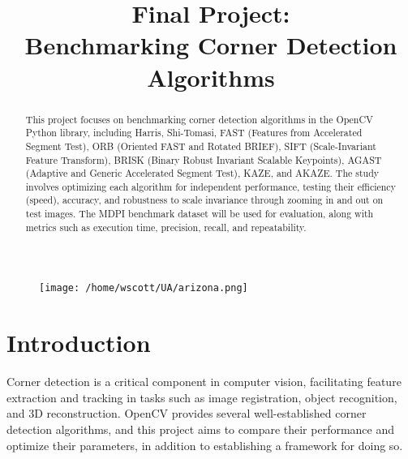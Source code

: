 \documentclass[journal]{IEEEtran}
\begin{document}
\title{Final Project:\\Benchmarking Corner Detection Algorithms}

\author{
}

\maketitle

\thispagestyle{plain}  %
\pagestyle{plain} 

\begin{figure}[H]
    \centering
    \begin{minipage}{\textwidth}
        \centering
    \texttt{[image: /home/wscott/UA/arizona.png]}
    \end{minipage}
\end{figure}

\onecolumn
\twocolumn
\pagebreak

\begin{abstract}
This project focuses on benchmarking corner detection algorithms in the OpenCV Python library, including Harris, Shi-Tomasi, FAST (Features from Accelerated Segment Test), ORB (Oriented FAST and Rotated BRIEF), SIFT (Scale-Invariant Feature Transform), BRISK (Binary Robust Invariant Scalable Keypoints), AGAST (Adaptive and Generic Accelerated Segment Test), KAZE, and AKAZE. The study involves optimizing each algorithm for independent performance, testing their efficiency (speed), accuracy, and robustness to scale invariance through zooming in and out on test images. The MDPI benchmark dataset will be used for evaluation, along with metrics such as execution time, precision, recall, and repeatability.
\end{abstract}

\section{Introduction}
Corner detection is a critical component in computer vision, facilitating feature extraction and tracking in tasks such as image registration, object recognition, and 3D reconstruction. OpenCV provides several well-established corner detection algorithms, and this project aims to compare their performance and optimize their parameters, in addition to establishing a framework for doing so.
\end{document}
